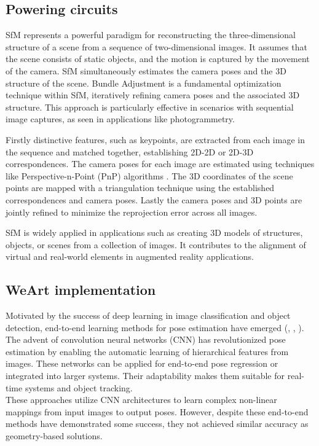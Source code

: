 \subsection{Powering circuits}
SfM \cite{SfM} represents a powerful paradigm for reconstructing the three-dimensional structure of a scene from a sequence of two-dimensional images. It assumes that the scene consists of static objects, and the motion is captured by the movement of the camera. SfM simultaneously estimates the camera poses and the 3D structure of the scene. Bundle Adjustment is a fundamental optimization technique within SfM, iteratively refining camera poses and the associated 3D structure. This approach is particularly effective in scenarios with sequential image captures, as seen in applications like photogrammetry.

Firstly distinctive features, such as keypoints, are extracted from each image in the sequence and matched together, establishing 2D-2D or 2D-3D correspondences. The camera poses for each image are estimated using techniques like Perspective-n-Point (PnP) algorithms \cite{Lepetit2009EPnPAA}. The 3D coordinates of the scene points are mapped with a triangulation technique using the established correspondences and camera poses. Lastly the camera poses and 3D points are jointly refined to minimize the reprojection error across all images.

SfM is widely applied in applications such as creating 3D models of structures, objects, or scenes from a collection of images. It contributes to the alignment of virtual and real-world elements in augmented reality applications.

\subsection{WeArt implementation}
Motivated by the success of deep learning in image classification and object detection, end-to-end learning methods for pose estimation have emerged (\cite{E2E1}, \cite{E2E2}, \cite{E2E3}). The advent of convolution neural networks (CNN) has revolutionized pose estimation by enabling the automatic learning of hierarchical features from images. These networks can be applied for end-to-end pose regression or integrated into larger systems. Their adaptability makes them suitable for real-time systems and object tracking.\\
These approaches utilize CNN architectures to learn complex non-linear mappings from input images to output poses. However, despite these end-to-end methods have demonstrated some success, they not achieved similar accuracy as geometry-based solutions.

